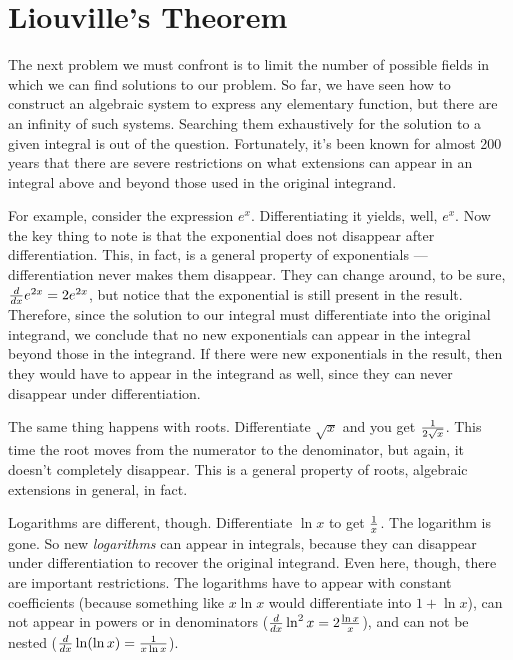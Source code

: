 \vfill\eject

\section{Liouville's Theorem}

The next problem we must confront is to limit the number of possible
fields in which we can find solutions to our problem.  So far, we have
seen how to construct an algebraic system to express any elementary
function, but there are an infinity of such systems.  Searching them
exhaustively for the solution to a given integral is out of the
question.  Fortunately, it's been known for almost 200 years that
there are severe restrictions on what extensions can appear in an
integral above and beyond those used in the original integrand.

For example, consider the expression $e^x$.  Differentiating it
yields, well, $e^x$.  Now the key thing to note is that the
exponential does not disappear after differentiation.  This, in fact,
is a general property of exponentials --- differentiation never makes
them disappear.  They can change around, to be sure,
${d\over dx}e^{2x}=2e^{2x}$, but notice that the exponential is still
present in the result.  Therefore, since the solution to our integral
must differentiate into the original integrand, we conclude that no
new exponentials can appear in the integral beyond those in the
integrand.  If there were new exponentials in the result, then they
would have to appear in the integrand as well, since they can never
disappear under differentiation.

The same thing happens with roots.  Differentiate $\sqrt{x}$ and you
get ${1\over{2\sqrt{x}}}$.  This time the root moves from the
numerator to the denominator, but again, it doesn't completely
disappear.  This is a general property of roots, algebraic extensions
in general, in fact.

Logarithms are different, though.  Differentiate $\ln x$ to get
$1\over x$.  The logarithm is gone.  So new {\it logarithms} can
appear in integrals, because they can disappear under differentiation
to recover the original integrand.  Even here, though, there are
important restrictions.  The logarithms have to appear with constant
coefficients (because something like $x\ln x$ would differentiate into
$1 + \ln x$), can not appear in powers or in denominators (${d\over
dx} \ln^2x = 2{\ln x\over x}$), and can not be nested (${d\over dx}
\ln(\ln x) = {1\over{x\ln x}}$).

